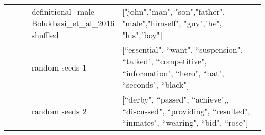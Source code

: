 \begin{longtable}[ht]{p{0.1\linewidth}p{0.3\linewidth}p{0.6\linewidth}}
 &
  definitional\_male-Bolukbasi\_et\_al\_2016 shuffled &
  {[}"john","man", "son","father", "male","himself", "guy","he", "his","boy"{]} \\
 &
  random seeds 1 &
  {[}``essential", ``want", ``suspension", ``talked", ``competitive", ``information", ``hero", ``bat", ``seconds", ``black"{]} \\
 &
  random seeds 2 &
  {[}``derby", ``passed", ``achieve",, ``discussed", ``providing", ``resulted", ``inmates", ``wearing", ``bid", ``rose"{]} \\ \bottomrule
\end{longtable}
